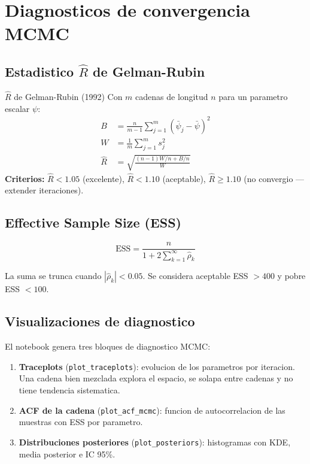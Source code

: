 \documentclass[12pt, a4paper]{article}
\theoremstyle{plain}
\theoremstyle{definition}
\theoremstyle{remark}
\begin{document}
\section{Diagnosticos de convergencia MCMC}

\subsection{Estadistico $\hat{R}$ de Gelman-Rubin}

\begin{teoremabox}{$\hat{R}$ de Gelman-Rubin (1992)}
Con $m$ cadenas de longitud $n$ para un parametro escalar $\psi$:
\begin{align}
  B &= \frac{n}{m-1}\sum_{j=1}^m (\bar{\psi}_j - \bar{\psi})^2 \\
  W &= \frac{1}{m}\sum_{j=1}^m s_j^2 \\
  \hat{R} &= \sqrt{\frac{(n-1)W/n + B/n}{W}}
\end{align}
\textbf{Criterios:} $\hat{R} < 1.05$ (excelente),
$\hat{R} < 1.10$ (aceptable),
$\hat{R} \geq 1.10$ (no convergio --- extender iteraciones).
\end{teoremabox}

\subsection{Effective Sample Size (ESS)}

\begin{equation}
  \text{ESS} = \frac{n}{1 + 2\sum_{k=1}^{\infty}\hat{\rho}_k}
  \label{eq:ess}
\end{equation}

La suma se trunca cuando $|\hat{\rho}_k| < 0.05$.
Se considera aceptable ESS $> 400$ y pobre ESS $< 100$.

\subsection{Visualizaciones de diagnostico}

El notebook genera tres bloques de diagnostico MCMC:

\begin{enumerate}[leftmargin=1.5em]
  \item \textbf{Traceplots} (\texttt{plot\_traceplots}):
        evolucion de los parametros por iteracion.
        Una cadena bien mezclada explora el espacio, se solapa entre cadenas
        y no tiene tendencia sistematica.
  \item \textbf{ACF de la cadena} (\texttt{plot\_acf\_mcmc}):
        funcion de autocorrelacion de las muestras con ESS por parametro.
  \item \textbf{Distribuciones posteriores} (\texttt{plot\_posteriors}):
        histogramas con KDE, media posterior e IC 95\%.
\end{enumerate}
\end{document}
